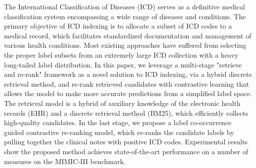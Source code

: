 The International Classification of Diseases (ICD) serves as a definitive medical classification system encompassing a wide range of diseases and conditions. The primary objective of ICD indexing is to allocate a subset of ICD codes to a medical record, which facilitates standardized documentation and management of various health conditions. Most existing approaches have suffered from selecting the proper label subsets from an extremely large ICD collection with a heavy long-tailed label distribution. In this paper, we leverage a multi-stage "retrieve and re-rank" framework as a novel solution to ICD indexing, via a hybrid discrete retrieval method, and re-rank retrieved candidates with contrastive learning that allows the model to make more accurate predictions from a simplified label space. The retrieval model is a hybrid of  auxiliary knowledge of the electronic health records (EHR) and  a discrete retrieval method (BM25), which efficiently collects high-quality candidates. In the last stage, we propose a label co-occurrence guided contrastive re-ranking model, which re-ranks the candidate labels by pulling together the clinical notes with positive ICD codes. Experimental results show the proposed method achieves state-of-the-art performance on a number of measures on the MIMIC-III benchmark.